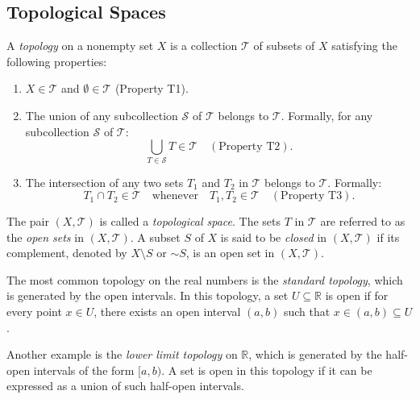 \subsection{Topological Spaces}
\begin{definition}
    A \textit{topology} on a nonempty set \( X \) is a collection \( \mathcal{T} \) of subsets of \( X \) satisfying the following properties:

    \begin{enumerate}
        \item \( X \in \mathcal{T} \) and \( \emptyset \in \mathcal{T} \) (Property T1).
        
        \item The union of any subcollection \( \mathcal{S} \) of \( \mathcal{T} \) belongs to \( \mathcal{T} \). Formally, for any subcollection \( \mathcal{S} \) of \( \mathcal{T} \):
        \[
        \bigcup_{T \in \mathcal{S}} T \in \mathcal{T} \quad (\text{Property T2}).
        \]
        
        \item The intersection of any two sets \( T_1 \) and \( T_2 \) in \( \mathcal{T} \) belongs to \( \mathcal{T} \). Formally:
        \[
        T_1 \cap T_2 \in \mathcal{T} \quad \text{whenever} \quad T_1, T_2 \in \mathcal{T} \quad (\text{Property T3}).
        \]
    \end{enumerate}

    The pair \( (X, \mathcal{T}) \) is called a \textit{topological space}. The sets \( T \) in \( \mathcal{T} \) are referred to as the \textit{open sets} in \( (X,\mathcal{T}) \). A subset \( S \) of \( X \) is said to be \textit{closed} in \( (X,\mathcal{T}) \) if its complement, denoted by \( X \setminus S \) or \( \sim S \), is an open set in \( (X,\mathcal{T}) \).

\end{definition}


\begin{example}
    The most common topology on the real numbers is the \textit{standard topology}, which is generated by the open intervals. In this topology, a set \( U \subseteq \mathbb{R} \) is open if for every point \( x \in U \), there exists an open interval \( (a, b) \) such that \( x \in (a, b) \subseteq U \).
\end{example}
\begin{example}
    Another example is the \textit{lower limit topology} on \( \mathbb{R} \), which is generated by the half-open intervals of the form \([a, b)\). A set is open in this topology if it can be expressed as a union of such half-open intervals.
\end{example}

